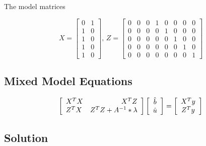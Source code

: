 \documentclass[
]{article}
\begin{document}
The model matrices

\[
X = \begin{bmatrix} 0 & 1 \\1 & 0 \\1 & 0 \\1 & 0 \\1 & 0\end{bmatrix} 
\text{, }Z = \begin{bmatrix} 0 & 0 & 0 & 1 & 0 & 0 & 0 & 0 \\0 & 0 & 0 & 0 & 1 & 0 & 0 & 0 \\0 & 0 & 0 & 0 & 0 & 1 & 0 & 0 \\0 & 0 & 0 & 0 & 0 & 0 & 1 & 0 \\0 & 0 & 0 & 0 & 0 & 0 & 0 & 1\end{bmatrix} 
\]

\hypertarget{mixed-model-equations}{%
\subsection{Mixed Model Equations}\label{mixed-model-equations}}

\begin{equation}
\left[
  \begin{array}{lr}
  X^TX  &  X^TZ \\
  Z^TX  &  Z^TZ + A^{-1}* \lambda
  \end{array}
\right]
\left[
  \begin{array}{c}
  \hat{b} \\
  \hat{u}
  \end{array}
\right]
=
\left[
  \begin{array}{c}
  X^Ty \\
  Z^Ty
  \end{array}
\right]
\notag
\end{equation}

\hypertarget{solution}{%
\subsection{Solution}\label{solution}}
\end{document}
